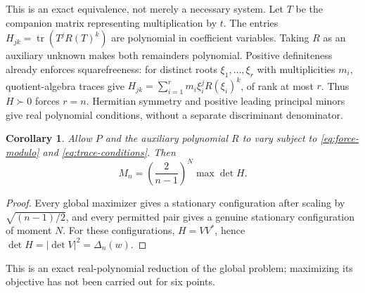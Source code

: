 \documentclass[11pt]{article}
\newtheorem{corollary}[theorem]{Corollary}
\theoremstyle{remark}
\numberwithin{equation}{section}
\begin{document}
This is an exact equivalence, not merely a necessary system.
Let $T$ be the companion matrix representing multiplication by $t$.
The entries $H_{jk}=\operatorname{tr}(T^jR(T)^k)$ are polynomial in
coefficient variables. Taking $R$ as an auxiliary unknown makes both
remainders polynomial. Positive definiteness already enforces
squarefreeness: for distinct roots $\xi_1,\ldots,\xi_r$ with
multiplicities $m_i$, quotient-algebra traces give
$H_{jk}=\sum_{i=1}^r m_i\xi_i^jR(\xi_i)^k$, of rank at most $r$.
Thus $H\succ0$ forces $r=n$.
Hermitian symmetry and positive leading principal minors give real
polynomial conditions, without a separate discriminant denominator.

\begin{corollary}\label{cor:trace-global}
Allow $P$ and the auxiliary polynomial $R$ to vary subject to
\eqref{eq:force-modulo} and \eqref{eq:trace-conditions}. Then
\begin{equation}\label{eq:trace-global}
 M_n=\left(\frac2{n-1}\right)^N\max\det H.
\end{equation}
\end{corollary}
\begin{proof}
Every global maximizer gives a stationary configuration after scaling
by $\sqrt{(n-1)/2}$, and every permitted pair gives a genuine
stationary configuration of moment $N$. For these configurations,
$H=VV^*$, hence $\det H=|\det V|^2=\Delta_n(w)$.
\end{proof}
This is an exact real-polynomial reduction of the global problem;
maximizing its objective has not been carried out for six points.
\end{document}
